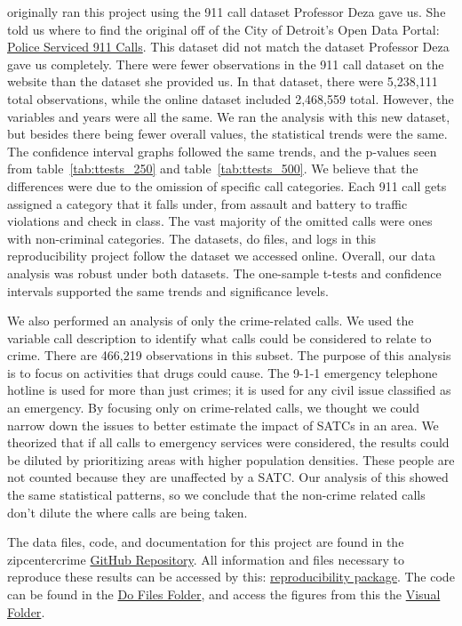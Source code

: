 \documentclass[12pt]{article}
\begin{document}

\We originally ran this project using the 911 call dataset Professor Deza gave us. She told us where to find the original off of the City of Detroit's Open Data Portal: \href{https://data.detroitmi.gov/datasets/detroitmi::police-serviced-911-calls/about}{Police Serviced 911 Calls}. This dataset did not match the dataset Professor Deza gave us completely. There were fewer observations in the 911 call dataset on the website than the dataset she provided us. In that dataset, there were 5,238,111 total observations, while the online dataset included 2,468,559 total. However, the variables and years were all the same. We ran the analysis with this new dataset, but besides there being fewer overall values, the statistical trends were the same. The confidence interval graphs followed the same trends, and the p-values seen from table~\ref{tab:ttests_250} and table~\ref{tab:ttests_500}. We believe that the differences were due to the omission of specific call categories. Each 911 call gets assigned a category that it falls under, from assault and battery to traffic violations and check in class. The vast majority of the omitted calls were ones with non-criminal categories. The datasets, do files, and logs in this reproducibility project follow the dataset we accessed online. Overall, our data analysis was robust under both datasets. The one-sample t-tests and confidence intervals supported the same trends and significance levels. 

We also performed an analysis of only the crime-related calls. We used the variable call description to identify what calls could be considered to relate to crime. There are 466,219 observations in this subset. The purpose of this analysis is to focus on activities that drugs could cause. The 9-1-1 emergency telephone hotline is used for more than just crimes; it is used for any civil issue classified as an emergency. By focusing only on crime-related calls, we thought we could narrow down the issues to better estimate the impact of SATCs in an area. We theorized that if all calls to emergency services were considered, the results could be diluted by prioritizing areas with higher population densities. These people are not counted because they are unaffected by a SATC. Our analysis of this showed the same statistical patterns, so we conclude that the non-crime related calls don't dilute the where calls are being taken. 

The data files, code, and documentation for this project are found in the zipcentercrime \href{https://github.com/ecn310/course-project-zipcentercrime}{GitHub Repository}. All information and files necessary to reproduce these results can be accessed by this: \href{https://github.com/ecn310/course-project-zipcentercrime/tree/main/Reproducibility%20Package}{reproducibility package}. The code can be found in the \href{https://github.com/ecn310/course-project-zipcentercrime/tree/main/Reproducibility%20Package/Downloaded_calls/Do_files}{Do Files Folder}, and access the figures from this the \href{https://github.com/ecn310/course-project-zipcentercrime/tree/main/Reproducibility%20Package/Downloaded_calls/Visual_Graphics_Downloaded_calls}{Visual Folder}. 
\end{document}

